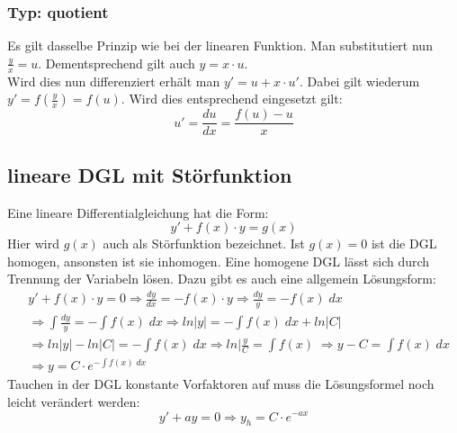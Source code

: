 \documentclass[a4paper,10pt]{scrartcl}
\begin{document}
        \subsubsection{Typ: quotient}
        Es gilt dasselbe Prinzip wie bei der linearen Funktion. Man substitutiert nun \(\frac{y}{x} = u\). Dementsprechend gilt auch \(y = x \cdot u\). \\
        Wird dies nun differenziert erhält man \(y' = u + x \cdot u'\). Dabei gilt wiederum \(y' = f(\frac{y}{x}) = f(u)\). Wird dies entsprechend eingesetzt gilt:
        \begin{equation}
            u' = \frac{du}{dx} = \frac{f(u) - u}{x}     
        \end{equation} 

        \subsection{lineare DGL mit Störfunktion}
        Eine lineare Differentialgleichung hat die Form: 
        \begin{equation}
            y' + f(x) \cdot y = g(x)
        \end{equation}
        Hier wird \(g(x)\) auch als Störfunktion bezeichnet. Ist \(g(x) = 0\) ist die DGL homogen, ansonsten ist sie inhomogen. Eine homogene DGL lässt sich 
        durch Trennung der Variabeln lösen. Dazu gibt es auch eine allgemein Lösungsform:
        \begin{equation}    
            \begin{aligned}
                & y' + f(x) \cdot y = 0 \Rightarrow \frac{dy}{dx} = -f(x) \cdot y \Rightarrow \frac{dy}{y} = -f(x) \; dx\\
                & \Rightarrow \int \frac{dy}{y} = - \int f(x) \; dx \Rightarrow ln|y| = - \int f(x) \; dx + ln|C| \\
                & \Rightarrow ln |y| - ln|C| = - \int f(x) \; dx \Rightarrow ln|\frac{y}{C} = \int f(x) \; \Rightarrow y - C = \int f(x) \; dx \\
                & \Rightarrow y = C \cdot e^{- \int f(x) \; dx}    
            \end{aligned}
        \end{equation}  
        Tauchen in der DGL konstante Vorfaktoren auf muss die Lösungsformel noch leicht verändert werden:
        \begin{equation}
            y' + ay = 0 \Rightarrow y_h = C \cdot e^{-ax}
        \end{equation}
\end{document}

